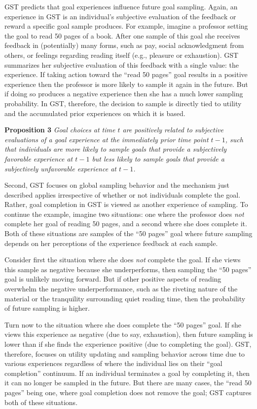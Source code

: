 \documentclass[english,,man]{apa6}
\theoremstyle{definition}
\theoremstyle{definition}
\theoremstyle{definition}
\theoremstyle{remark}
\begin{document}
GST predicts that goal experiences influence future goal sampling.
Again, an experience in GST is an individual's subjective evaluation of
the feedback or reward a specific goal sample produces. For example,
imagine a professor setting the goal to read 50 pages of a book. After
one sample of this goal she receives feedback in (potentially) many
forms, such as pay, social acknowledgment from others, or feelings
regarding reading itself (e.g., pleasure or exhaustion). GST summarizes
her subjective evaluation of this feedback with a single value: the
experience. If taking action toward the \enquote{read 50 pages} goal
results in a positive experience then the professor is more likely to
sample it again in the future. But if doing so produces a negative
experience then she has a much lower sampling probability. In GST,
therefore, the decision to sample is directly tied to utility and the
accumulated prior experiences on which it is based.

\textbf{Proposition 3} \emph{Goal choices at time \(t\) are positively
related to subjective evaluations of a goal experience at the
immediately prior time point \(t - 1\), such that individuals are more
likely to sample goals that provide a subjectively favorable experience
at \(t - 1\) but less likely to sample goals that provide a subjectively
unfavorable experience at \(t - 1\).}

Second, GST focuses on global sampling behavior and the mechanism just
described applies irrespective of whether or not individuals complete
the goal. Rather, goal completion in GST is viewed as another experience
of sampling. To continue the example, imagine two situations: one where
the professor does \emph{not} complete her goal of reading 50 pages, and
a second where she does complete it. Both of these situations are
samples of the \enquote{50 pages} goal where future sampling depends on
her perceptions of the experience feedback at each sample.

Consider first the situation where she does \emph{not} complete the
goal. If she views this sample as negative because she underperforms,
then sampling the \enquote{50 pages} goal is unlikely moving forward.
But if other positive aspects of reading overwhelm the negative
underperformance, such as the riveting nature of the material or the
tranquility surrounding quiet reading time, then the probability of
future sampling is higher.

Turn now to the situation where she does complete the \enquote{50 pages}
goal. If she views this experience as negative (due to say, exhaustion),
then future sampling is lower than if she finds the experience positive
(due to completing the goal). GST, therefore, focuses on utility
updating and sampling behavior across time due to various experiences
regardless of where the individual lies on their \enquote{goal
completion} continuum. If an individual terminates a goal by completing
it, then it can no longer be sampled in the future. But there are many
cases, the \enquote{read 50 pages} being one, where goal completion does
not remove the goal; GST captures both of these situations.
\end{document}
